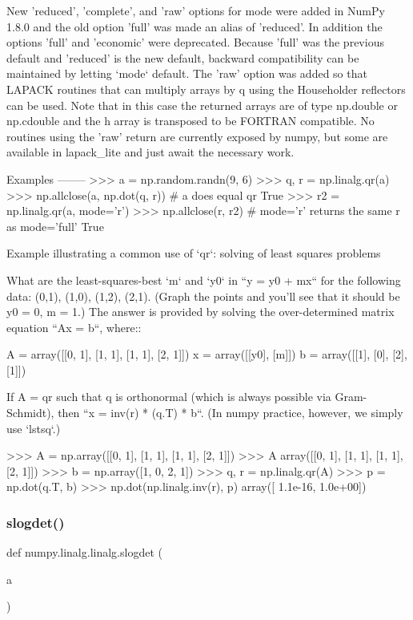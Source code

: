\begin{DoxyVerb}
New 'reduced', 'complete', and 'raw' options for mode were added in
NumPy 1.8.0 and the old option 'full' was made an alias of 'reduced'.  In
addition the options 'full' and 'economic' were deprecated.  Because
'full' was the previous default and 'reduced' is the new default,
backward compatibility can be maintained by letting `mode` default.
The 'raw' option was added so that LAPACK routines that can multiply
arrays by q using the Householder reflectors can be used. Note that in
this case the returned arrays are of type np.double or np.cdouble and
the h array is transposed to be FORTRAN compatible.  No routines using
the 'raw' return are currently exposed by numpy, but some are available
in lapack_lite and just await the necessary work.

Examples
--------
>>> a = np.random.randn(9, 6)
>>> q, r = np.linalg.qr(a)
>>> np.allclose(a, np.dot(q, r))  # a does equal qr
True
>>> r2 = np.linalg.qr(a, mode='r')
>>> np.allclose(r, r2)  # mode='r' returns the same r as mode='full'
True

Example illustrating a common use of `qr`: solving of least squares
problems

What are the least-squares-best `m` and `y0` in ``y = y0 + mx`` for
the following data: {(0,1), (1,0), (1,2), (2,1)}. (Graph the points
and you'll see that it should be y0 = 0, m = 1.)  The answer is provided
by solving the over-determined matrix equation ``Ax = b``, where::

  A = array([[0, 1], [1, 1], [1, 1], [2, 1]])
  x = array([[y0], [m]])
  b = array([[1], [0], [2], [1]])

If A = qr such that q is orthonormal (which is always possible via
Gram-Schmidt), then ``x = inv(r) * (q.T) * b``.  (In numpy practice,
however, we simply use `lstsq`.)

>>> A = np.array([[0, 1], [1, 1], [1, 1], [2, 1]])
>>> A
array([[0, 1],
       [1, 1],
       [1, 1],
       [2, 1]])
>>> b = np.array([1, 0, 2, 1])
>>> q, r = np.linalg.qr(A)
>>> p = np.dot(q.T, b)
>>> np.dot(np.linalg.inv(r), p)
array([  1.1e-16,   1.0e+00])\end{DoxyVerb}
 \mbox{\label{namespacenumpy_1_1linalg_1_1linalg_a63ee98d66e6ed6c2e7e17a24a8d5304e}} 
\subsubsection{\texorpdfstring{slogdet()}{slogdet()}}
{\footnotesize\ttfamily def numpy.\+linalg.\+linalg.\+slogdet (\begin{DoxyParamCaption}\item[{}]{a }\end{DoxyParamCaption})}

